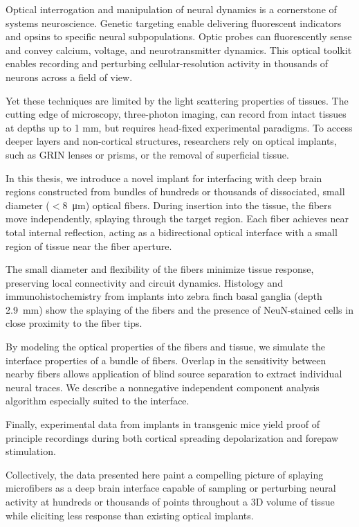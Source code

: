 
Optical interrogation and manipulation of neural dynamics 
is a cornerstone of systems neuroscience. Genetic targeting 
enable delivering fluorescent indicators and opsins to 
specific neural subpopulations. Optic probes can 
fluorescently sense and convey calcium, voltage, and 
neurotransmitter dynamics. This optical toolkit enables 
recording and perturbing cellular-resolution activity in 
thousands of neurons across a field of view.

Yet these techniques are limited by the light scattering 
properties of tissues. The cutting edge of microscopy, 
three-photon imaging, can record from intact tissues at 
depths up to 1 mm, but requires head-fixed experimental 
paradigms. To access deeper layers and non-cortical 
structures, researchers rely on optical implants, such as 
GRIN lenses or prisms, or the removal of superficial 
tissue. 

In this thesis, we introduce a novel implant for 
interfacing with deep brain regions constructed from 
bundles of hundreds or thousands of dissociated, small 
diameter ($<$8~\si{\micro\meter}) optical fibers. During 
insertion into the tissue, the fibers move independently, 
splaying through the target region. Each fiber achieves 
near total internal reflection, acting as a bidirectional 
optical interface with a small region of tissue near the 
fiber aperture.

The small diameter and flexibility of the fibers minimize 
tissue response, preserving local connectivity and circuit 
dynamics. Histology and immunohistochemistry from implants 
into zebra finch basal ganglia (depth 2.9~mm) show the 
splaying of the fibers and the presence of NeuN-stained 
cells in close proximity to the fiber tips.

By modeling the optical properties of the fibers and 
tissue, we simulate the interface properties of a bundle 
of fibers. Overlap in the sensitivity between nearby 
fibers allows application of blind source separation to 
extract individual neural traces. We describe a nonnegative 
independent component analysis algorithm especially suited 
to the interface.

Finally, experimental data from implants in transgenic 
mice yield proof of principle recordings during both 
cortical spreading depolarization and forepaw 
stimulation.

Collectively, the data presented here paint a compelling 
picture of splaying microfibers as a deep brain interface 
capable of sampling or perturbing neural activity at 
hundreds or thousands of points throughout a 3D volume of 
tissue while eliciting less response than existing optical 
implants.
